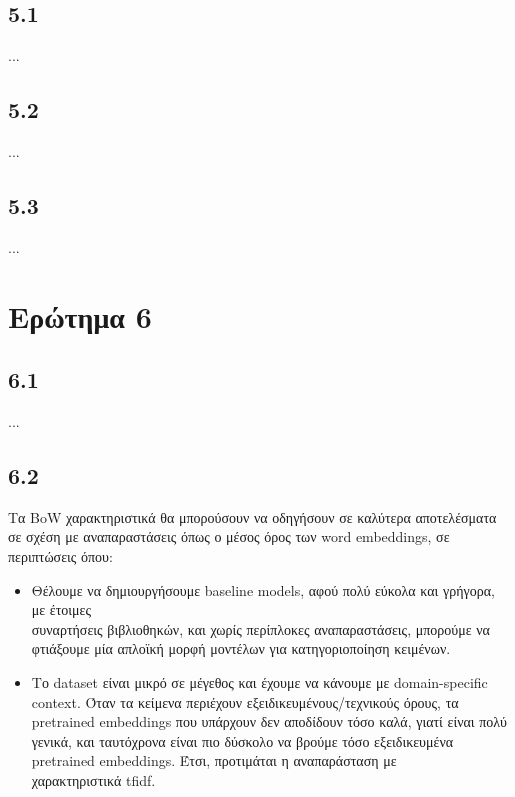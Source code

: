\documentclass[a4paper, 12pt]{article}
\begin{document}
    \subsection*{5.1}

        ...

    \subsection*{5.2}

        ...

    \subsection*{5.3}

        ...

\section*{Ερώτημα 6}

    \subsection*{6.1}
        
        ...
    
    \subsection*{6.2}
        
        Τα BoW χαρακτηριστικά θα μπορούσουν να οδηγήσουν σε καλύτερα αποτελέσματα σε σχέση με αναπαραστάσεις όπως ο μέσος όρος των word embeddings, σε περιπτώσεις όπου:
        
        \begin{itemize}
            \item Θέλουμε να δημιουργήσουμε baseline models, αφού πολύ εύκολα και γρήγορα, με έτοιμες \\ συναρτήσεις βιβλιοθηκών, και χωρίς περίπλοκες αναπαραστάσεις, μπορούμε να φτιάξουμε μία απλοϊκή μορφή μοντέλων για κατηγοριοποίηση κειμένων.
            \item Το dataset είναι μικρό σε μέγεθος και έχουμε να κάνουμε με domain-specific context. Όταν τα κείμενα περιέχουν εξειδικευμένους/τεχνικούς όρους, τα pretrained embeddings που υπάρχουν δεν αποδίδουν τόσο καλά, γιατί είναι πολύ γενικά, και ταυτόχρονα είναι πιο δύσκολο να βρούμε τόσο εξειδικευμένα pretrained embeddings. Έτσι, προτιμάται η αναπαράσταση με \\ χαρακτηριστικά tfidf.
        \end{itemize}
\end{document}
